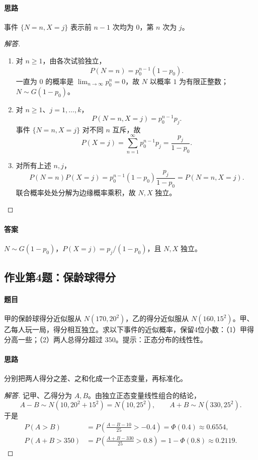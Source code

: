 \paragraph{思路}事件 $\{N=n,X=j\}$ 表示前 $n-1$ 次均为 $0$，第 $n$ 次为 $j$。
\begin{proof}[解答]
\begin{enumerate}
\item 对 $n\geq1$，由各次试验独立，
\[
P(N=n)=p_0^{n-1}(1-p_0).
\]
一直为 $0$ 的概率是 $\lim_{n\to\infty}p_0^n=0$，故 $N$ 以概率 $1$ 为有限正整数；$N\sim G(1-p_0)$。
\item 对 $n\geq1$、$j=1,\ldots,k$，
\[
P(N=n,X=j)=p_0^{n-1}p_j.
\]
事件 $\{N=n,X=j\}$ 对不同 $n$ 互斥，故
\[
P(X=j)=\sum_{n=1}^\infty p_0^{n-1}p_j=\frac{p_j}{1-p_0}.
\]
\item 对所有上述 $n,j$，
\[
P(N=n)P(X=j)=p_0^{n-1}(1-p_0)\frac{p_j}{1-p_0}
=P(N=n,X=j).
\]
联合概率处处分解为边缘概率乘积，故 $N,X$ 独立。
\end{enumerate}
\end{proof}
\paragraph{答案}$N\sim G(1-p_0)$，$P(X=j)=p_j/(1-p_0)$，且 $N,X$ 独立。

\subsection{作业第4题：保龄球得分}\label{ex:w11-h4}
\paragraph{题目}
甲的保龄球得分近似服从 $N(170,20^2)$，乙的得分近似服从 $N(160,15^2)$。甲、乙每人玩一局，得分相互独立。求以下事件的近似概率，保留4位小数：（1）甲得分高一些；（2）两人总得分超过 $350$。提示：正态分布的线性性。
\paragraph{思路}分别把两人得分之差、之和化成一个正态变量，再标准化。
\begin{proof}[解答]
记甲、乙得分为 $A,B$。由独立正态变量线性组合的结论，
\[
A-B\sim N(10,20^2+15^2)=N(10,25^2),\qquad
A+B\sim N(330,25^2).
\]
于是
\begin{align*}
P(A>B)&=P\left(\frac{A-B-10}{25}>-0.4\right)
=\Phi(0.4)\approx0.6554,\\
P(A+B>350)&=P\left(\frac{A+B-330}{25}>0.8\right)
=1-\Phi(0.8)\approx0.2119.
\end{align*}
\end{proof}
